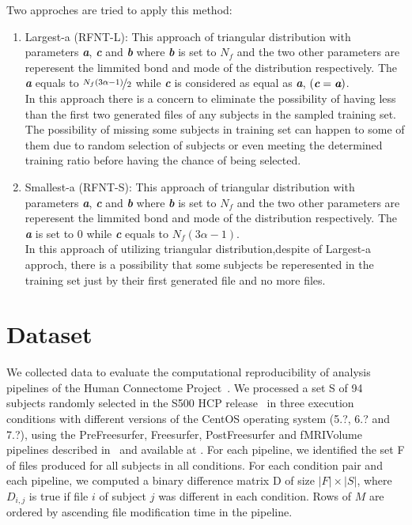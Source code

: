 \documentclass[10pt, conference, compsocconf]{IEEEtran}
\newcommand{\todo}[1]{\marginpar{\parbox{18mm}{\flushleft\tiny\color{red}\textbf{TODO}:
      #1}}}
\begin{document}
Two approches are tried to apply this method:
\begin{enumerate}
\item Largest-a (RFNT-L):  
This approach of triangular distribution with parameters \textit{\textbf{a}}, \textit{\textbf{c}} 
and \textit{\textbf{b}} where \textit{\textbf{b}} is set to $N_{f}$ and the two other 
parameters are reperesent the limmited bond and mode of the distribution respectively. 
The \textit{\textbf{a}} equals to $\nicefrac {N_{f}(3\alpha-1)}{2}$ while \textit{\textbf{c}} 
is considered as equal as \textit{\textbf{a}}, $(\textit{\textbf{c}} = \textit{\textbf{a}})$.\\

In this approach there is a concern to eliminate the possibility of having less 
than the first two generated files of any subjects in the sampled training set. 
The possibility of missing some subjects in training set can happen to some of them due to 
random selection of subjects or even meeting the determined training ratio before 
having the chance of being selected.

\item Smallest-a (RFNT-S):
This approach of triangular distribution with parameters \textit{\textbf{a}}, \textit{\textbf{c}} 
and \textit{\textbf{b}} where \textit{\textbf{b}} is set to $N_{f}$ and the
two other parameters are reperesent the limmited bond and mode of the distribution respectively. 
The \textit{\textbf{a}} is set to $0$  while \textit{\textbf{c}} equals to $N_{f}(3\alpha-1)$.\\
In this approach of utilizing triangular distribution,despite of Largest-a approch, there is a possibility 
that some subjects be reperesented in the training set just by their first generated file and no more files.

\end{enumerate}

\section{Dataset}

We collected data to evaluate the computational reproducibility of analysis
pipelines of the Human Connectome Project~\cite{general-hcp}. We
processed a set S of 94 subjects randomly selected in the S500 HCP
release~\todo{URL} in three execution conditions with different
versions of the CentOS operating system (5.?, 6.? and 7.?), using the
PreFreesurfer, Freesurfer, PostFreesurfer and fMRIVolume pipelines
described in~\cite{hcp-pipelines} and available at \todo{URL}. For
each pipeline, we identified the set F of files produced for all
subjects in all conditions. For each condition pair and each pipeline,
we computed a binary difference matrix D of size $|F|\times|S|$, where $D_{i,j}$ is true
if file $i$ of subject $j$ was different in each condition. Rows of
$M$ are ordered by ascending file modification time in the pipeline.
\end{document}
